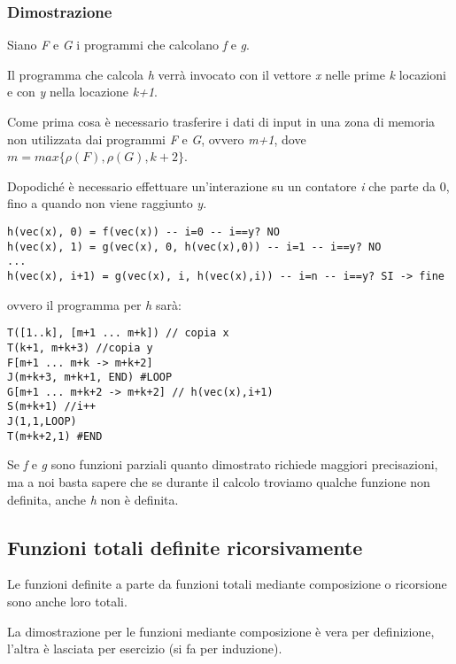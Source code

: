 \subsubsection{Dimostrazione}\label{dimostrazione-1}

Siano \emph{F} e \emph{G} i programmi che calcolano \emph{f} e \emph{g}.

Il programma che calcola \emph{h} verrà invocato con il vettore \emph{x}
nelle prime \emph{k} locazioni e con \emph{y} nella locazione
\emph{k+1}.

Come prima cosa è necessario trasferire i dati di input in una zona di
memoria non utilizzata dai programmi \emph{F} e \emph{G}, ovvero
\emph{m+1}, dove $m = max\{\rho(F), \rho(G), k+2\}$.

Dopodiché è necessario effettuare un'interazione su un contatore
\emph{i} che parte da 0, fino a quando non viene raggiunto \emph{y}.

\begin{verbatim}
h(vec(x), 0) = f(vec(x)) -- i=0 -- i==y? NO
h(vec(x), 1) = g(vec(x), 0, h(vec(x),0)) -- i=1 -- i==y? NO
...
h(vec(x), i+1) = g(vec(x), i, h(vec(x),i)) -- i=n -- i==y? SI -> fine
\end{verbatim}

ovvero il programma per \emph{h} sarà:

\begin{lstlisting}[language=URM]
T([1..k], [m+1 ... m+k]) // copia x
T(k+1, m+k+3) //copia y
F[m+1 ... m+k -> m+k+2]
J(m+k+3, m+k+1, END) #LOOP
G[m+1 ... m+k+2 -> m+k+2] // h(vec(x),i+1)
S(m+k+1) //i++
J(1,1,LOOP)
T(m+k+2,1) #END
\end{lstlisting}

Se \emph{f} e \emph{g} sono funzioni parziali quanto dimostrato richiede
maggiori precisazioni, ma a noi basta sapere che se durante il calcolo
troviamo qualche funzione non definita, anche \emph{h} non è definita.

\subsection{Funzioni totali definite ricorsivamente}\label{osservazione-senza-titolo}

Le funzioni definite a parte da funzioni totali mediante composizione o
ricorsione sono anche loro totali.

La dimostrazione per le funzioni mediante composizione è vera per
definizione, l'altra è lasciata per esercizio (si fa per induzione).

